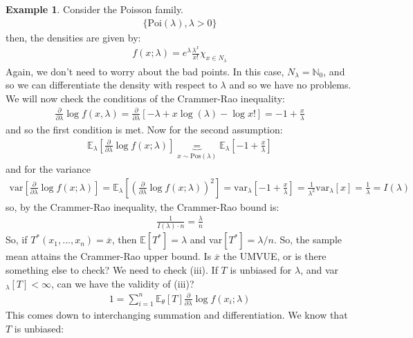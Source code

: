 \documentclass[11pt]{scrartcl}
\theoremstyle{definition}
\newtheorem{ex}{Example}
\theoremstyle{remark}
\newcommand{\EX}[1]{\mathbb{E}\left[#1 \right]}
\newcommand{\EXth}[1]{\mathbb{E}_\theta \left[ #1 \right]}
\begin{document}
\begin{ex}
	Consider the Poisson family. 
	\begin{align*}
		\{ \text{Poi}(\lambda), \lambda > 0 \} 
	\end{align*}
	then, the densities are given by: 
	\begin{align*}
		f(x; \lambda) = e^\lambda \frac{\lambda^x}{x!} \chi_{x \in N_\lambda} 	
	\end{align*}
	Again, we don't need to worry about the bad points. In this case, $N_\lambda = \mathbb{N}_0$, and so we can differentiate the density with respect to $\lambda$ and so we have no problems. We will now check the conditions of the Crammer-Rao inequality: 
	\begin{align*}
		\frac{\partial}{\partial \lambda} \log f(x, \lambda) = \frac{\partial}{\partial \lambda} \left[ 	-\lambda + x \log (\lambda) - \log x!		\right] 	 = -1 + \frac{x}{\lambda}
	\end{align*}
	and so the first condition is met. Now for the second assumption: 
	\begin{align*}
		\mathbb{E}_\lambda \left[ 	\frac{\partial}{\partial \lambda} \log f(x; \lambda) 	\right] \underbrace{=}_{x \sim \text{Pos}(\lambda)} \mathbb{E}_\lambda \left[ 	-1 + \frac{x}{\lambda}		\right]
	\end{align*}
	and for the variance
	\begin{align*}
		\text{var} \left[ \frac{\partial}{\partial \lambda } \log f(x; \lambda) \right] 	 = \mathbb{E}_\lambda \left[ 	\left( 	\frac{\partial}{\partial \lambda}	 \log f(x; \lambda) \right)^2		\right] = \text{var}_\lambda \left[ -1 + \frac{x}{\lambda} \right] = \frac{1}{\lambda^2} \text{var}_\lambda[x] = \frac{1}{\lambda} = I(\lambda) 
	\end{align*}
	so, by the Crammer-Rao inequality, the Crammer-Rao bound is: 
	\begin{align*}
		\frac{1}{I(\lambda) \cdot n} = \frac{\lambda}{n}	
	\end{align*}
	So, if $T^*(x_1, ..., x_n)  = \overline{x}$, then $\EX{T^*} = \lambda$ and var$[T^*] = \lambda / n$. So, the sample mean attains the Crammer-Rao upper bound. Is $\overline{x}$ the UMVUE, or is there something else to check? We need to check (iii). If $T$ is unbiased for $\lambda$, and var$_\lambda [T]< \infty$, can we have the validity of (iii)? 
	\begin{align*}
		1 = \sum_{i=1}^n \EXth{T} \frac{\partial}{\partial \lambda} \log f(x_i; \lambda) 	
	\end{align*}
	This comes down to interchanging summation and differentiation. We know that $T$ is unbiased: 

\end{ex}
\end{document}
